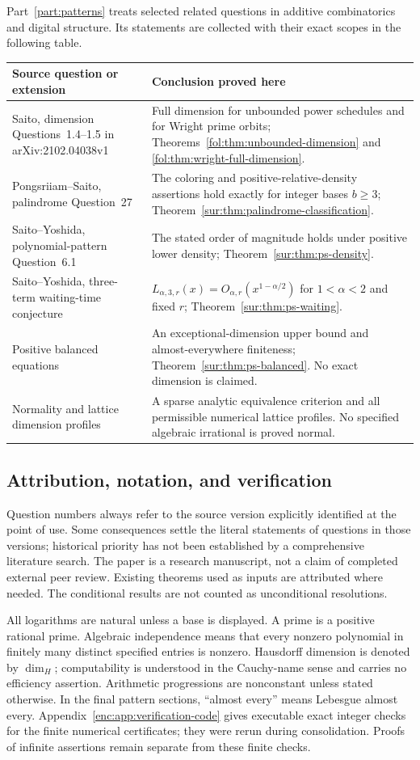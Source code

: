 \documentclass[11pt,a4paper]{article}
\theoremstyle{definition}
\theoremstyle{remark}
\numberwithin{equation}{section}
\begin{document}
Part~\ref{part:patterns} treats selected related questions in additive
combinatorics and digital structure. Its statements are collected with
their exact scopes in the following table.
\begin{longtable}{@{}p{}p{}@{}}
\toprule
Source question or extension & Conclusion proved here\\ \midrule
Saito, dimension Questions~1.4--1.5 in arXiv:2102.04038v1
& Full dimension for unbounded power schedules and for Wright prime
orbits; Theorems~\ref{fol:thm:unbounded-dimension} and
\ref{fol:thm:wright-full-dimension}.\\[4pt]
Pongsriiam--Saito, palindrome Question~27
& The coloring and positive-relative-density assertions hold exactly
for integer bases $b\ge3$; Theorem~\ref{sur:thm:palindrome-classification}.\\[4pt]
Saito--Yoshida, polynomial-pattern Question~6.1
& The stated order of magnitude holds under positive lower density;
Theorem~\ref{sur:thm:ps-density}.\\[4pt]
Saito--Yoshida, three-term waiting-time conjecture
& $L_{\alpha,3,r}(x)=O_{\alpha,r}(x^{1-\alpha/2})$ for
$1<\alpha<2$ and fixed $r$; Theorem~\ref{sur:thm:ps-waiting}.\\[4pt]
Positive balanced equations
& An exceptional-dimension upper bound and almost-everywhere finiteness;
Theorem~\ref{sur:thm:ps-balanced}. No exact dimension is claimed.\\[4pt]
Normality and lattice dimension profiles
& A sparse analytic equivalence criterion and all permissible numerical
lattice profiles. No specified algebraic irrational is proved normal.\\
\bottomrule
\end{longtable}

\subsection{Attribution, notation, and verification}
Question numbers always refer to the source version explicitly identified
at the point of use. Some consequences settle the literal statements of
questions in those versions; historical priority has not been established
by a comprehensive literature search. The paper is a research manuscript,
not a claim of completed external peer review. Existing theorems used as
inputs are attributed where needed. The conditional results are not
counted as unconditional resolutions.

All logarithms are natural unless a base is displayed. A prime is a
positive rational prime. Algebraic independence means that every nonzero
polynomial in finitely many distinct specified entries is nonzero.
Hausdorff dimension is denoted by $\dim_H$; computability is understood
in the Cauchy-name sense and carries no efficiency assertion. Arithmetic
progressions are nonconstant unless stated otherwise. In the final
pattern sections, ``almost every'' means Lebesgue almost every.
Appendix~\ref{enc:app:verification-code} gives executable exact integer
checks for the finite numerical certificates; they were rerun during
consolidation. Proofs of infinite assertions remain separate from these
finite checks.
\end{document}
